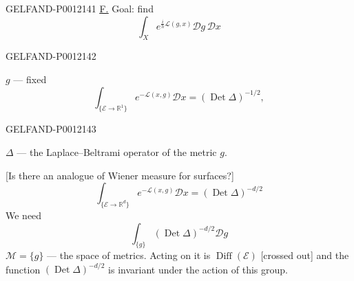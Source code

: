 \begin{GelfandAdjacentEvidence}{GELFAND-P001214}{1}
\underline{\underline{F.}} Goal: find
\begin{equation*}
\int_X e^{\frac ih\mathcal L(g,x)}\mathcal Dg\,\mathcal Dx\tag{2}
\end{equation*}
\end{GelfandAdjacentEvidence}
\begin{GelfandAdjacentEvidence}{GELFAND-P001214}{2}


\(g\) --- fixed
\begin{equation*}
\int_{\{\mathcal E\to\mathbb R^1\}}e^{-\mathcal L(x,g)}\mathcal Dx
=(\operatorname{Det}\Delta)^{-1/2},\tag{3}
\end{equation*}
\end{GelfandAdjacentEvidence}
\begin{GelfandAdjacentEvidence}{GELFAND-P001214}{3}

\(\Delta\) --- the Laplace--Beltrami operator of the metric \(g\).

[Is there an analogue of Wiener measure for surfaces?]
\begin{equation*}
\int_{\{\mathcal E\to\mathbb R^d\}}e^{-\mathcal L(x,g)}\mathcal Dx
=(\operatorname{Det}\Delta)^{-d/2}\tag{4}
\end{equation*}
We need
\begin{equation*}
\int_{\{g\}}(\operatorname{Det}\Delta)^{-d/2}\mathcal Dg\tag{5}
\end{equation*}
\(\mathcal M=\{g\}\) --- the space of metrics. Acting on it is \(\operatorname{Diff}(\mathcal E)\)
[crossed out] and the function \((\operatorname{Det}\Delta)^{-d/2}\) is invariant under the action of this group.
\end{GelfandAdjacentEvidence}

